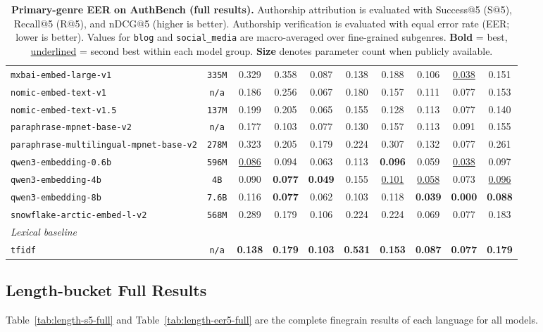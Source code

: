 \documentclass[11pt]{article}
\begin{document}
\begin{table}[htbp]
{\begin{tabular}{lccccccccc}
\texttt{mxbai-embed-large-v1} & \texttt{335M} & 0.329 & 0.358 & 0.087 & 0.138 & 0.188 & 0.106 & \underline{0.038} & 0.151 \\
\texttt{nomic-embed-text-v1} & \texttt{n/a} & 0.186 & 0.256 & 0.067 & 0.180 & 0.157 & 0.111 & 0.077 & 0.153 \\
\texttt{nomic-embed-text-v1.5} & \texttt{137M} & 0.199 & 0.205 & 0.065 & 0.155 & 0.128 & 0.113 & 0.077 & 0.140 \\
\texttt{paraphrase-mpnet-base-v2} & \texttt{n/a} & 0.177 & 0.103 & 0.077 & 0.130 & 0.157 & 0.113 & 0.091 & 0.155 \\
\texttt{paraphrase-multilingual-mpnet-base-v2} & \texttt{278M} & 0.323 & 0.205 & 0.179 & 0.224 & 0.307 & 0.132 & 0.077 & 0.261 \\
\texttt{qwen3-embedding-0.6b} & \texttt{596M} & \underline{0.086} & 0.094 & 0.063 & 0.113 & \textbf{0.096} & 0.059 & \underline{0.038} & 0.097 \\
\texttt{qwen3-embedding-4b} & \texttt{4B} & 0.090 & \textbf{0.077} & \textbf{0.049} & 0.155 & \underline{0.101} & \underline{0.058} & 0.073 & \underline{0.096} \\
\texttt{qwen3-embedding-8b} & \texttt{7.6B} & 0.116 & \textbf{0.077} & 0.062 & 0.103 & 0.118 & \textbf{0.039} & \textbf{0.000} & \textbf{0.088} \\
\texttt{snowflake-arctic-embed-l-v2} & \texttt{568M} & 0.289 & 0.179 & 0.106 & 0.224 & 0.224 & 0.069 & 0.077 & 0.183 \\
\midrule
\multicolumn{10}{l}{\textit{Lexical baseline}} \\
\midrule
\texttt{tfidf} & \texttt{n/a} & \textbf{0.138} & \textbf{0.179} & \textbf{0.103} & \textbf{0.531} & \textbf{0.153} & \textbf{0.087} & \textbf{0.077} & \textbf{0.179} \\
\bottomrule
\end{tabular}
}
\caption{\textbf{Primary-genre EER on AuthBench (full results).} Authorship attribution is evaluated with Success@5 (S@5), Recall@5 (R@5), and nDCG@5 (higher is better). Authorship verification is evaluated with equal error rate (EER; lower is better). Values for \texttt{blog} and \texttt{social\_media} are macro-averaged over fine-grained subgenres. \textbf{Bold} = best, \underline{underlined} = second best within each model group. \textbf{Size} denotes parameter count when publicly available.}
\label{tab:genre-eer5-full}
\end{table}

\subsection{Length-bucket Full Results}
Table~\ref{tab:length-s5-full} and Table~\ref{tab:length-eer5-full} are the complete finegrain results of each language for all models.
\end{document}
